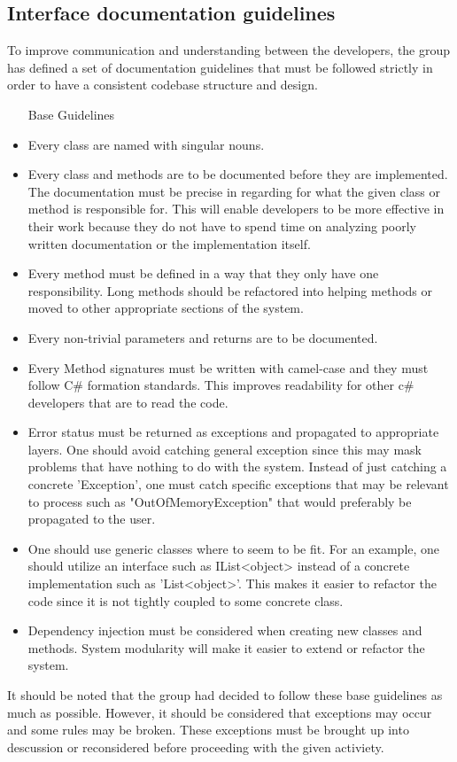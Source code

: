 \subsection{Interface documentation guidelines}
To improve communication and understanding between the developers, the group has defined a set of documentation guidelines that must be followed strictly in order to have a consistent codebase structure and design. 


\begin{itemize}
	\item[Base Guidelines]
	\item Every class are named with singular nouns.
	\item Every class and methods are to be documented before they are implemented. The documentation must be precise in regarding for what the given class or method is responsible for. This will enable developers to be more effective in their work because they do not have to spend time on analyzing poorly written documentation or the implementation itself.
	\item Every method must be defined in a way that they only have one responsibility. Long methods should be refactored into helping methods or moved to other appropriate sections of the system.
	\item Every non-trivial parameters and returns are to be documented.
	\item Every Method signatures must be written with camel-case and they must follow C\# formation standards. This improves readability for other c\# developers that are to read the code.
	\item Error status must be returned as exceptions and propagated to appropriate layers. One should avoid catching general exception since this may mask problems that have nothing to do with the system. Instead of just catching a concrete 'Exception', one must catch specific exceptions that may be relevant to process such as "OutOfMemoryException" that would preferably be propagated to the user.
	\item One should use generic classes where to seem to be fit. For an example, one should utilize an interface such as IList<object> instead of a concrete implementation such as 'List<object>'. This makes it easier to refactor the code since it is not tightly coupled to some concrete class.
	\item Dependency injection must be considered when creating new classes and methods. System modularity will make it easier to extend or refactor the system.
	
\end{itemize}

It should be noted that the group had decided to follow these base guidelines as much as possible. However, it should be considered that exceptions may occur and some rules may be broken. These exceptions must be brought up into descussion or reconsidered before proceeding with the given activiety.